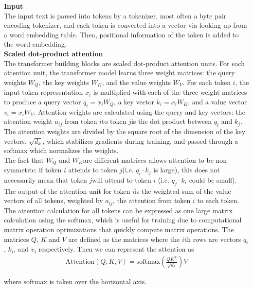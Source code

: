 \textbf{Input}\\
The input text is parsed into tokens by a tokenizer, most often a byte pair encoding tokenizer, and each token is converted into a vector via looking up from a word embedding table. Then, positional information of the token is added to the word embedding.
\\

\textbf{Scaled dot-product attention} \\
The transformer building blocks are scaled dot-product attention units. For each attention unit, the transformer model learns three weight matrices: the query weights \(W_Q\), the key weights \(W_K\), and the value weights \(W_V\). For each token \(i\), the input token representation \(x_i\) is multiplied with each of the three weight matrices to produce a query vector \(q_i = x_iW_Q\), a key vector \(k_i = x_iW_K\), and a value vector \(v_i=x_iW_V\). Attention weights are calculated using the query and key vectors: the attention weight \(a_{ij}\) from token  \(i\)to token \(j\)is the dot product between \(q_i\) and \(k_j\). The attention weights are divided by the square root of the dimension of the key vectors, \(\sqrt{d_k}\), which stabilizes gradients during training, and passed through a softmax which normalizes the weights.
\\

The fact that \(W_Q\) and \(W_K\)are different matrices allows attention to be non-symmetric: if token \(i\) attends to token  \(j\)(i.e.  \(q_i\cdot k_j\) is large), this does not necessarily mean that token  \(j\)will attend to token \(i\) (i.e. \(q_j\cdot k_i\) could be small). The output of the attention unit for token \(i\)is the weighted sum of the value vectors of all tokens, weighted by \(a_{ij}\), the attention from token \(i\) to each token.
\\

The attention calculation for all tokens can be expressed as one large matrix calculation using the softmax, which is useful for training due to computational matrix operation optimizations that quickly compute matrix operations. The matrices \(Q\), \(K\) and \(V\) are defined as the matrices where the \(i\)th rows are vectors \(q_i\), \(k_i\), and \(v_i\) respectively. Then we can represent the attention as
\begin{align}
\text{Attention}(Q, K, V) = \text{softmax}\left(\frac{QK^\mathrm{T}}{\sqrt{d_k}}\right)V
\end{align}

where softmax is taken over the horizontal axis.
\\

